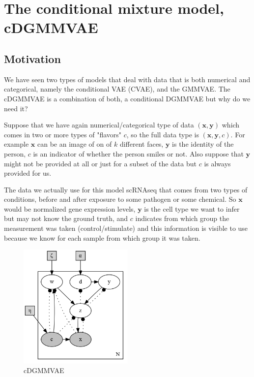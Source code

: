 \documentclass[11pt, a4paper]{report}
\theoremstyle{plain}
\theoremstyle{definition}
\theoremstyle{remark}
\newcommand{\x}{\mathbf{x}}
\newcommand{\y}{\mathbf{y}}
\begin{document}
\chapter{The conditional mixture model, cDGMMVAE}
\section{Motivation}

We have seen two types of models that deal with data that is both numerical and
categorical, namely the conditional VAE (CVAE), and the GMMVAE.
The cDGMMVAE is a combination of both, a conditional DGMMVAE but why do we need
it?

Suppose that we have again numerical/categorical type of data $(\x, \y)$ which 
comes in two or more types of "flavors" $c$, so the full data type 
is $(\x, \y, c)$. For example $\x$ can be an image of on of $k$ 
different faces, 
$\y$ is the identity of the person, $c$ is an indicator of whether the person
smiles or not. 
Also suppose that $\y$ might not be provided at all or just for
a subset of the data but $c$ is always provided for us.

The data we actually use for this model scRNAseq that comes from two types 
of conditions, before and after exposure to some pathogen or some chemical.
So $\x$ would be normalized gene expression levels, $\y$ is the cell type 
we want to infer but may not know the ground truth, and $c$ indicates from which
group the measurement was taken (control/stimulate) and this information is
visible to use because we know for each sample from which group it was
taken.


\begin{figure}[!hb]
\begin{framed}
\centering
\includegraphics[width=0.5\textwidth]{plots/dirichlet_gmm_cvae.gv.png}
\caption{cDGMMVAE}
\label{fig:dirgmmcvae}
\end{framed}
\end{figure}
\end{document}
